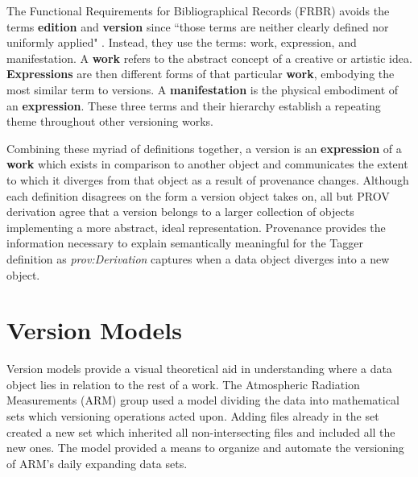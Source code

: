 The Functional Requirements for Bibliographical Records (FRBR) avoids the terms \textbf{edition} and \textbf{version} since ``those terms are neither clearly defined nor uniformly applied" \cite{frbr}.
Instead, they use the terms: work, expression, and manifestation.
A \textbf{work} refers to the abstract concept of a creative or artistic idea.
\textbf{Expressions} are then different forms of that particular \textbf{work}, embodying the most similar term to versions.
A \textbf{manifestation} is the physical embodiment of an \textbf{expression}.
These three terms and their hierarchy establish a repeating theme throughout other versioning works.

Combining these myriad of definitions together, a version is an \textbf{expression} of a \textbf{work} which exists in comparison to another object and communicates the extent to which it diverges from that object as a result of provenance changes.
Although each definition disagrees on the form a version object takes on, all but PROV derivation agree that a version belongs to a larger collection of objects implementing a more abstract, ideal representation.
Provenance provides the information necessary to explain semantically meaningful for the Tagger definition as \textit{prov:Derivation} captures when a data object diverges into a new object.


\section{Version Models} \label{sec:models}

Version models provide a visual theoretical aid in understanding where a data object lies in relation to the rest of a work.
The Atmospheric Radiation Measurements (ARM) group used a model dividing the data into mathematical sets which versioning operations acted upon\cite{6906868}.
Adding files already in the set created a new set which inherited all non-intersecting files and included all the new ones.
The model provided a means to organize and automate the versioning of ARM's daily expanding data sets.

